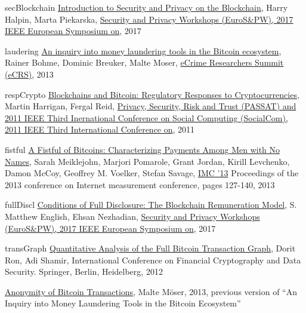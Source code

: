 \begin{thebibliography}{1}
\item{secBlockchain}
\href{https://hal.inria.fr/hal-01673293/document}{Introduction to Security and
Privacy on the Blockchain}, Harry Halpin, Marta Piekarska,
\href{http://ieeexplore.ieee.org/xpl/mostRecentIssue.jsp?punumber=7966454}
{Security and Privacy Workshops (EuroS\&PW), 2017 IEEE European Symposium on},
2017

\item{laudering}
\href{http://ieeexplore.ieee.org/document/6805780/}{An inquiry into money
laundering tools in the Bitcoin ecosystem}, Rainer Bohme, Dominic Breuker,
Malte Moser,
\href{http://ieeexplore.ieee.org/xpl/mostRecentIssue.jsp?punumber=6802823}
{eCrime Researchers Summit (eCRS)}, 2013

\item{respCrypto}
\href{https://papers.ssrn.com/sol3/papers.cfm?abstract_id=2704852}
{Blockchains and Bitcoin: Regulatory Responses to Cryptocurrencies}, 
Martin Harrigan, Fergal Reid, 
\href{http://ieeexplore.ieee.org/xpl/mostRecentIssue.jsp?punumber=6112285}
{Privacy, Security, Risk and Trust (PASSAT) and 2011 IEEE Third Inernational
Conference on Social Computing (SocialCom), 2011 IEEE Third International
Conference on}, 2011

\item{fistful}
\href{https://cseweb.ucsd.edu/~smeiklejohn/files/imc13.pdf}{A Fistful of
Bitcoins: Characterizing Payments Among Men with No Names}, Sarah Meiklejohn,
Marjori Pomarole, Grant Jordan, Kirill Levchenko, Damon McCoy, Geoffrey M.
Voelker, Stefan Savage, 
\href{http://www.sigcomm.org/events/imc-conference/}{IMC '13} Proceedings of
the 2013 conference on Internet measurement conference, pages 127-140, 2013

\item{fullDiscl}
\href{http://ieeexplore.ieee.org/document/7966972/}{Conditions of Full
Disclosure: The Blockchain Remuneration Model}, S. Matthew English, 
Ehsan Nezhadian,
\href{http://ieeexplore.ieee.org/xpl/mostRecentIssue.jsp?punumber=7966454}
{Security and Privacy Workshops (EuroS\&PW), 2017 IEEE European Symposium on},
2017

\item{transGraph}
\href{http://arimoto.lolipop.jp/584.pdf}{Quantitative Analysis of the Full
Bitcoin Transaction Graph}, Dorit Ron, Adi Shamir, International Conference on
Financial Cryptography and Data Security. Springer, Berlin, Heidelberg, 2012

\item{}
\href{https://www.wi.uni-muenster.de/sites/wi/files/public/department/itsecurity/mbc13/mbc13-moeser-paper.pdf}
{Anonymity of Bitcoin Transactions}, Malte Möser, 2013, previous version of
``An Inquiry into Money Laundering Tools in the Bitcoin Ecosystem''

\end{thebibliography}

